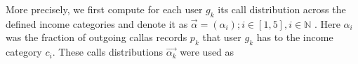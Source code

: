 More precisely, we first compute for each user $g_k$ its call distribution  across the defined income categories and denote it as $\vec{\alpha} =(\alpha_i); i \in [1,5], i\in \mathbb{N}$ . Here $\alpha_i$ was the fraction of outgoing callas records $p_k$ that user $g_k$ has to the income category $c_i$. These calls distributions $\vec{\alpha_k}$ were used as 